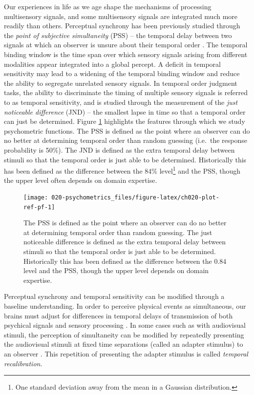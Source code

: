 \documentclass[11pt, oneside, openany]{scrbook}
\begin{document}
Our experiences in life as we age shape the mechanisms of processing multisensory signals, and some multisensory signals are integrated much more readily than others. Perceptual synchrony has been previously studied through the \emph{point of subjective simultaneity} (PSS) -- the temporal delay between two signals at which an observer is unsure about their temporal order \citep{stone2001now}. The temporal binding window is the time span over which sensory signals arising from different modalities appear integrated into a global percept. A deficit in temporal sensitivity may lead to a widening of the temporal binding window and reduce the ability to segregate unrelated sensory signals. In temporal order judgment tasks, the ability to discriminate the timing of multiple sensory signals is referred to as temporal sensitivity, and is studied through the measurement of the \emph{just noticeable difference} (JND) -- the smallest lapse in time so that a temporal order can just be determined. Figure \ref{fig:ch020-plot-ref-pf} highlights the features through which we study psychometric functions. The PSS is defined as the point where an observer can do no better at determining temporal order than random guessing (i.e.~the response probability is 50\%). The JND is defined as the extra temporal delay between stimuli so that the temporal order is just able to be determined. Historically this has been defined as the difference between the 84\% level\footnote{One standard deviation away from the mean in a Gaussian distribution.} and the PSS, though the upper level often depends on domain expertise.

\begin{figure}

{\centering \texttt{[image: 020-psychometrics\_files/figure-latex/ch020-plot-ref-pf-1]} 

}

\caption{The PSS is defined as the point where an observer can do no better at determining temporal order than random guessing. The just noticeable difference is defined as the extra temporal delay between stimuli so that the temporal order is just able to be determined. Historically this has been defined as the difference between the 0.84 level and the PSS, though the upper level depends on domain expertise.}\label{fig:ch020-plot-ref-pf}
\end{figure}

Perceptual synchrony and temporal sensitivity can be modified through a baseline understanding. In order to perceive physical events as simultaneous, our brains must adjust for differences in temporal delays of transmission of both psychical signals and sensory processing \citep{fujisaki2004recalibration}. In some cases such as with audiovisual stimuli, the perception of simultaneity can be modified by repeatedly presenting the audiovisual stimuli at fixed time separations (called an adapter stimulus) to an observer \citep{vroomen2004recalibration}. This repetition of presenting the adapter stimulus is called \emph{temporal recalibration}.
\end{document}
